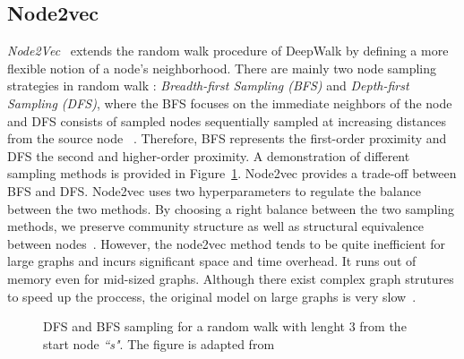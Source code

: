 \subsection{Node2vec}
\label{subsec:node2vec}
\emph{Node2Vec}~ extends the random walk procedure of DeepWalk by defining a more flexible notion of a node’s neighborhood. There are mainly two node sampling strategies in random walk : \emph{Breadth-first Sampling (BFS)} and \emph{Depth-first Sampling (DFS)}, where the BFS focuses on the immediate neighbors of the node and DFS consists of sampled nodes sequentially sampled at increasing distances from the
source node ~. Therefore, BFS represents the first-order proximity and DFS the second and higher-order proximity. A demonstration of different sampling methods is provided in Figure~\ref{fig:dfs_bfs}. Node2vec provides a trade-off between BFS and DFS. Node2vec uses two hyperparameters to regulate the balance between the two methods. By choosing a right balance between the two sampling methods, we preserve community structure as well as structural equivalence
between nodes~. However, the node2vec method tends to be quite inefficient for large graphs and incurs significant space and time overhead. It runs out of memory even for mid-sized graphs. Although there exist complex graph strutures to speed up the proccess, the original model on large graphs is very slow~. 
\begin{figure}
\centering 
\resizebox{0.45\textwidth}{0.25\textwidth}{      

}
\caption{DFS and BFS sampling for a random walk with lenght $3$ from the start node \emph{``s"}. The figure is adapted from ~}
\label{fig:dfs_bfs}
\end{figure}

